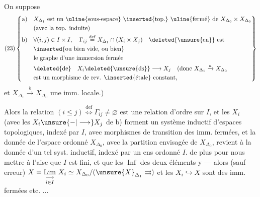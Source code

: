 On suppose
\[
(23)\left\{\begin{aligned}
\text{a)}\quad &X_{\Delta_1}\text{ est un \uline{sous-espace} \inserted{top.} \uline{fermé} de }X_{\Delta_0}\times X_{\Delta_0}\\
&\text{(avec la top. induite)}\\
\text{b)}\quad &\forall(i,j)\in I\times I,\quad\Gamma_{ij}\overset{\mathrm{def}}{=}X_{\Delta_1}\cap(X_i\times X_j)\quad\text{\deleted{\unsure{en}} est}\\
&\text{\inserted{ou bien vide, ou bien}}\\
&\text{le graphe d'une immersion fermée}\\
&\deleted{\text{de}}\quad X_i\deleted{\text{\unsure{ds}}}\longrightarrow X_j
\quad\text{(donc }X_{\Delta_1}\xrightarrow{a}X_{\Delta_0}\\
&\text{est un morphisme de rev. \inserted{étale} constant,}
\end{aligned}\right\}
\]
 et $X_{\Delta_1}\xrightarrow{b}X_{\Delta_0}$ une imm. locale.)

Alors la relation $(i\leq j)\overset{\mathrm{def}}{\Longleftrightarrow}\Gamma_{ij}\ne\varnothing$ est une
relation d'ordre sur $I$,  et les $X_i$
(avec les $X_i\unsure{-|\longrightarrow}X_j$ de b) forment un
système inductif d'espaces topologiques,
indexé par $I$, avec morphismes de
transition des imm. fermées, et
la donnée de l'espace  ordonné $X_{\Delta_0}$,
 avec la partition envisagée de $X_{\Delta_0}$,
revient à la donnée d'un tel syst.
inductif, indexé par un ens ordonné $I$.
 de plus pour nous mettre
à l'aise que $I$ est fini, et que les
$\operatorname{Inf}$ des deux éléments y  --- alors
(sauf erreur) $X=\underset{i\in I}{\underset{\longrightarrow}{\mathrm{Lim}}}\ X_i\simeq
X_{\Delta_0}/(\unsure{X}_{\Delta_1}\rightrightarrows)$
et les $X_i\hookrightarrow X$ sont des imm. fermées
etc. ...
